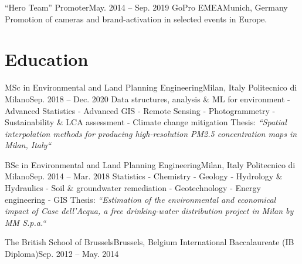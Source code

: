 \documentclass[letterpaper,11pt]{article}
\begin{document}
\subHeading
{“Hero Team” Promoter}{May. 2014 -- Sep. 2019}
{GoPro EMEA}{Munich, Germany}
{Promotion of cameras and brand-activation in selected events in Europe.}

\subHeadingListEnd


\section{Education}
\subHeadingListStart

\subHeading
{MSc in Environmental and Land Planning Engineering}{Milan, Italy}
{Politecnico di Milano}{Sep. 2018 -- Dec. 2020}
{\scriptsize Data structures, analysis \& ML for environment - Advanced Statistics - Advanced GIS -
  Remote Sensing - Photogrammetry -
  Sustainability \& LCA assessment - Climate change mitigation\newline
  {\scriptsize Thesis: \it “Spatial interpolation methods for producing high-resolution PM2.5
    concentration maps in Milan, Italy“}}

\subHeading
{BSc in Environmental and Land Planning Engineering}{Milan, Italy}
{Politecnico di Milano}{Sep. 2014 -- Mar. 2018}
{\scriptsize Statistics - Chemistry - Geology - Hydrology \& Hydraulics
  - Soil \& groundwater remediation - Geotechnology - Energy engineering - GIS\newline
  {\scriptsize Thesis: \it “Estimation of the environmental and economical impact of Case dell'Acqua,
    a free drinking-water distribution project in Milan by MM S.p.a.“}}

\subHeading
{The British School of Brussels}{Brussels, Belgium}
{International Baccalaureate (IB Diploma)}{Sep. 2012 -- May. 2014}{}
\subHeadingListEnd

\end{document}
